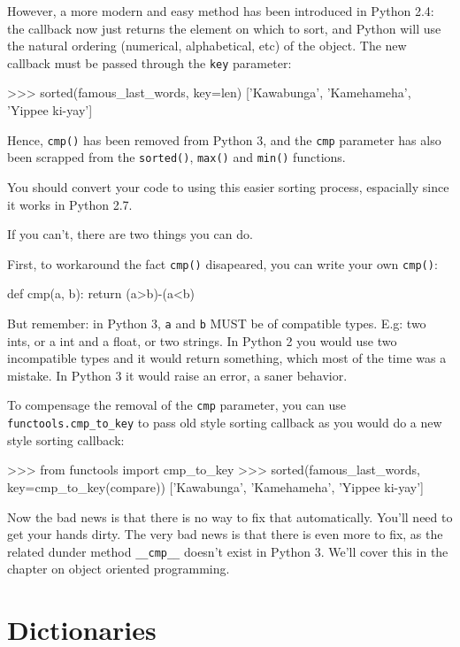 However, a more modern and easy method has been introduced in Python 2.4: the callback now just returns the element on which to sort, and Python will use the natural ordering (numerical, alphabetical, etc) of the object. The new callback must be passed through the \lstinline{key} parameter:

\begin{py2and3}
>>> sorted(famous_last_words, key=len)
['Kawabunga', 'Kamehameha', 'Yippee ki-yay']
\end{py2and3}

Hence, \lstinline{cmp()} has been removed from Python 3, and the \lstinline{cmp} parameter has also been scrapped from the \lstinline{sorted()}, \lstinline{max()} and \lstinline{min()} functions.

You should convert your code to using this easier sorting process, espacially since it works in Python 2.7.

If you can't, there are two things you can do.

First, to workaround the fact \lstinline{cmp()} disapeared, you can write your own \lstinline{cmp()}:

\begin{py2and3}
def cmp(a, b):
    return (a>b)-(a<b)
\end{py2and3}

But remember: in Python 3, \lstinline{a} and \lstinline{b} MUST be of compatible types. E.g: two ints, or a int and a float, or two strings. In Python 2 you would use two incompatible types and it would return something, which most of the time was a mistake. In Python 3 it would raise an error, a saner behavior.

To compensage the removal of the \lstinline{cmp} parameter, you can use \lstinline{functools.cmp_to_key} to pass old style sorting callback as you would do a new style sorting callback:

\begin{py2and3}
>>> from functools import cmp_to_key
>>> sorted(famous_last_words, key=cmp_to_key(compare))
['Kawabunga', 'Kamehameha', 'Yippee ki-yay']
\end{py2and3}

Now the bad news is that there is no way to fix that automatically. You'll need to get your hands dirty. The very bad news is that there is even more to fix, as the related \gls{dunder} method \lstinline{__cmp__} doesn't exist in Python 3. We'll cover this in the chapter on object oriented programming.


\section{Dictionaries}

